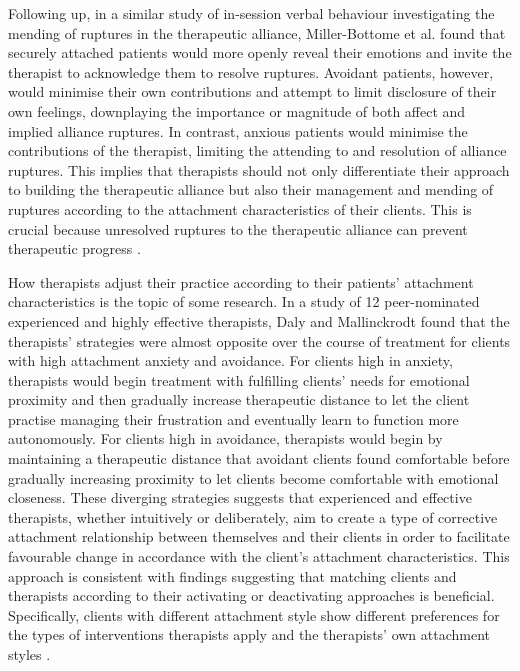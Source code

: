 \documentclass[12pt]{report}
\begin{document}
Following up, in a similar study of in-session verbal behaviour investigating the mending of ruptures in the therapeutic alliance, Miller-Bottome et al. \citeyear{MillerBottome2018} found that securely attached patients would more openly reveal their emotions and invite the therapist to acknowledge them to resolve ruptures.
Avoidant patients, however, would minimise their own contributions and attempt to limit disclosure of their own feelings, downplaying the importance or magnitude of both affect and implied alliance ruptures.
In contrast, anxious patients would minimise the contributions of the therapist, limiting the attending to and resolution of alliance ruptures.
This implies that therapists should not only differentiate their approach to building the therapeutic alliance but also their management and mending of ruptures according to the attachment characteristics of their clients.
This is crucial because unresolved ruptures to the therapeutic alliance can prevent therapeutic progress \cite{RodgersCailholBuiEtAl2010}.

How therapists adjust their practice according to their patients' attachment characteristics is the topic of some research.
In a study of 12 peer-nominated experienced and highly effective therapists, Daly and Mallinckrodt \citeyear{Daly2009} found that the therapists' strategies were almost opposite over the course of treatment for clients with high attachment anxiety and avoidance.
For clients high in anxiety, therapists would begin treatment with fulfilling clients' needs for emotional proximity and then gradually increase therapeutic distance to let the client practise managing their frustration and eventually learn to function more autonomously.
For clients high in avoidance, therapists would begin by maintaining a therapeutic distance that avoidant clients found comfortable before gradually increasing proximity to let clients become comfortable with emotional closeness.
These diverging strategies suggests that experienced and effective therapists, whether intuitively or deliberately, aim to create a type of corrective attachment relationship between themselves and their clients in order to facilitate favourable change in accordance with the client's attachment characteristics.
This approach is consistent with findings suggesting that matching clients and therapists according to their activating or deactivating approaches is beneficial.
Specifically, clients with different attachment style show different preferences for the types of interventions therapists apply  and the therapists' own attachment styles .
\end{document}
